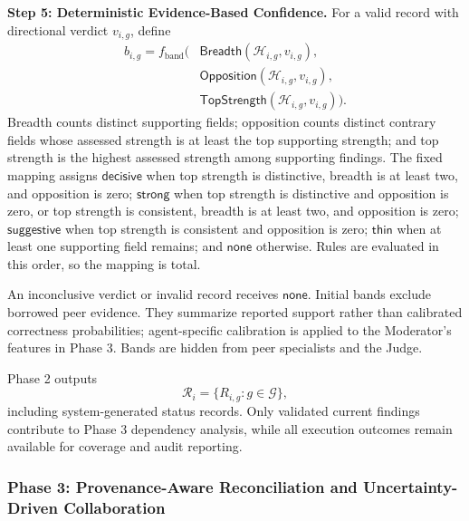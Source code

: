 \medskip
\noindent\textbf{Step 5: Deterministic
Evidence-Based Confidence.}
For a valid record with directional
verdict $v_{i,g}$, define
\begin{equation}
\begin{aligned}
b_{i,g}=f_{\mathrm{band}}\big(
&\mathsf{Breadth}(\mathcal H_{i,g},v_{i,g}),\\
&\mathsf{Opposition}(\mathcal H_{i,g},v_{i,g}),\\
&\mathsf{TopStrength}(\mathcal H_{i,g},v_{i,g})
\big).
\end{aligned}
\label{eq:record-confidence}
\end{equation}
Breadth counts distinct supporting fields; opposition counts distinct
contrary fields whose assessed strength is at least the top supporting
strength; and top strength is the highest assessed strength among
supporting findings. The fixed mapping assigns $\mathsf{decisive}$ when
top strength is distinctive, breadth is at least two, and opposition is
zero; $\mathsf{strong}$ when top strength is distinctive and opposition is
zero, or top strength is consistent, breadth is at least two, and
opposition is zero; $\mathsf{suggestive}$ when top strength is consistent
and opposition is zero; $\mathsf{thin}$ when at least one supporting field
remains; and $\mathsf{none}$ otherwise. Rules are evaluated in this order,
so the mapping is total.

An inconclusive verdict or invalid
record receives $\mathsf{none}$.
Initial bands exclude borrowed
peer evidence. They summarize
reported support rather than
calibrated correctness probabilities;
agent-specific calibration is applied
to the Moderator's features in
Phase 3. Bands are hidden from
peer specialists and the Judge.

Phase 2 outputs
\begin{equation}
\mathcal R_i=
\{R_{i,g}:g\in\mathcal G\},
\label{eq:phase2-output}
\end{equation}
including system-generated status
records. Only validated current
findings contribute to Phase 3
dependency analysis, while all
execution outcomes remain available
for coverage and audit reporting.




\subsubsection*{\textbf{Phase 3: Provenance-Aware
Reconciliation and Uncertainty-Driven Collaboration}}
\label{sec:phase3}

